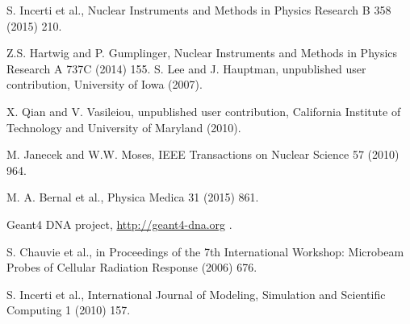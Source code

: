 S. Incerti et al.,
                        Nuclear Instruments and Methods in Physics Research B 358 (2015) 210.

 Z.S. Hartwig and P. Gumplinger,
                  Nuclear Instruments and Methods in Physics Research A 737C (2014) 155.
 S. Lee and J. Hauptman, unpublished user contribution,
                     University of Iowa (2007).

 X. Qian and V. Vasileiou, unpublished user contribution,
                    California Institute of Technology and University of 
                    Maryland (2010).  

 M. Janecek and W.W. Moses,
                  IEEE Transactions on Nuclear Science 57 (2010) 964.

 M. A. Bernal et al., 
                     Physica Medica 31 (2015) 861.


 Geant4 DNA project, \url{http://geant4-dna.org} .

 S. Chauvie et al., in Proceedings of the 7th International 
                     Workshop: Microbeam Probes of Cellular Radiation Response (2006) 676.

 S. Incerti et al., 
                    International Journal of Modeling, Simulation and Scientific Computing 1 (2010) 157.

